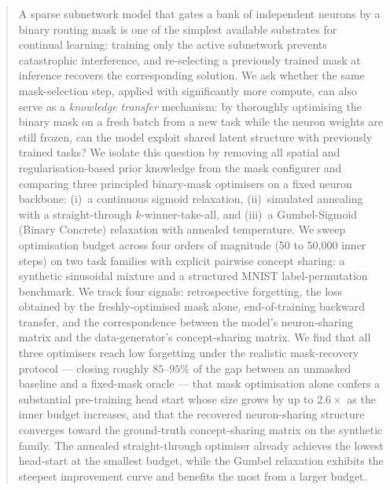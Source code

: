 \documentclass{article}
\theoremstyle{plain}
\theoremstyle{remark}
\begin{document}

\printAffiliationsAndNotice{}

\begin{abstract}
A sparse subnetwork model that gates a bank of independent neurons by a
binary routing mask is one of the simplest available substrates for
continual learning: training only the active subnetwork prevents
catastrophic interference, and re-selecting a previously trained mask at
inference recovers the corresponding solution. We ask whether the same
mask-selection step, applied with significantly more compute, can also
serve as a \emph{knowledge transfer} mechanism: by thoroughly
optimising the binary mask on a fresh batch from a new task while the
neuron weights are still frozen, can the model exploit shared latent
structure with previously trained tasks? We isolate this question by
removing all spatial and regularisation-based prior knowledge from the
mask configurer and comparing three principled binary-mask optimisers
on a fixed neuron backbone: (i)~a continuous sigmoid relaxation,
(ii)~simulated annealing with a straight-through $k$-winner-take-all,
and (iii)~a Gumbel-Sigmoid (Binary Concrete) relaxation with annealed
temperature.  We sweep optimisation budget across four orders of
magnitude (50 to 50{,}000 inner steps) on two task families with
explicit pairwise concept sharing: a synthetic sinusoidal mixture and a
structured MNIST label-permutation benchmark. We track four signals:
retrospective forgetting, the loss obtained by the freshly-optimised
mask alone, end-of-training backward transfer, and the correspondence
between the model's neuron-sharing matrix and the data-generator's
concept-sharing matrix.  We find that all three optimisers reach
low forgetting under the realistic mask-recovery protocol --- closing
roughly $85$--$95\%$ of the gap between an unmasked baseline and a
fixed-mask oracle --- that mask optimisation alone confers a
substantial pre-training head start whose size grows by up to
$2.6\times$ as the inner budget increases, and that the recovered
neuron-sharing structure converges toward the ground-truth
concept-sharing matrix on the synthetic family. The annealed
straight-through optimiser already achieves the lowest head-start at
the smallest budget, while the Gumbel relaxation exhibits the steepest
improvement curve and benefits the most from a larger budget.
\end{abstract}
\end{document}
